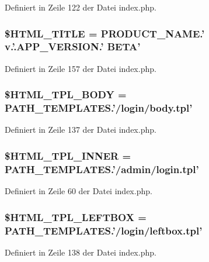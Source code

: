 Definiert in Zeile 122 der Datei index.php.
\subsubsection{\setlength{\rightskip}{0pt plus 5cm}\$HTML\_\-TITLE = PRODUCT\_\-NAME.' v.'.APP\_\-VERSION.' BETA'}\label{index_8php_fd08af1760011918ee8aeab27309ed7e}




Definiert in Zeile 157 der Datei index.php.
\subsubsection{\setlength{\rightskip}{0pt plus 5cm}\$HTML\_\-TPL\_\-BODY = PATH\_\-TEMPLATES.'/login/body.tpl'}\label{index_8php_132a7bf90078fd9ad70b6057c8c2682a}




Definiert in Zeile 137 der Datei index.php.
\subsubsection{\setlength{\rightskip}{0pt plus 5cm}\$HTML\_\-TPL\_\-INNER = PATH\_\-TEMPLATES.'/admin/login.tpl'}\label{index_8php_0d0ccbfae545490b87c076e183ef6c5c}




Definiert in Zeile 60 der Datei index.php.
\subsubsection{\setlength{\rightskip}{0pt plus 5cm}\$HTML\_\-TPL\_\-LEFTBOX = PATH\_\-TEMPLATES.'/login/leftbox.tpl'}\label{index_8php_19d93cdfaed5a4e939eae3d2d5c455af}




Definiert in Zeile 138 der Datei index.php.
